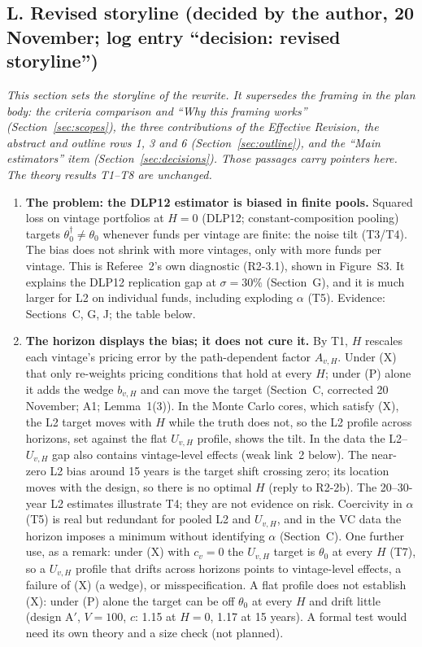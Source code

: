 \documentclass[11pt]{article}
\begin{document}
\subsection*{L. Revised storyline (decided by the author, 20 November; log entry ``decision: revised storyline'')}
\label{sec:storyline}
\emph{This section sets the storyline of the rewrite. It supersedes the framing in the plan body: the criteria comparison and ``Why this framing works'' (Section~\ref{sec:scopes}), the three contributions of the Effective Revision, the abstract and outline rows 1, 3 and 6 (Section~\ref{sec:outline}), and the ``Main estimators'' item (Section~\ref{sec:decisions}). Those passages carry pointers here. The theory results T1--T8 are unchanged.}
\begin{enumerate}
\item \textbf{The problem: the DLP12 estimator is biased in finite pools.} Squared loss on vintage portfolios at $H=0$ (DLP12; constant-composition pooling) targets $\theta_0^\dagger\neq\theta_0$ whenever funds per vintage are finite: the noise tilt (T3/T4). The bias does not shrink with more vintages, only with more funds per vintage. This is Referee~2's own diagnostic (R2-3.1), shown in Figure~S3. It explains the DLP12 replication gap at $\sigma=30\%$ (Section~G), and it is much larger for L2 on individual funds, including exploding $\alpha$ (T5). Evidence: Sections~C, G, J; the table below.
\item \textbf{The horizon displays the bias; it does not cure it.} By T1, $H$ rescales each vintage's pricing error by the path-dependent factor $A_{v,H}$. Under (X) that only re-weights pricing conditions that hold at every $H$; under (P) alone it adds the wedge $b_{v,H}$ and can move the target (Section~C, corrected 20 November; A1; Lemma~1(3)). In the Monte Carlo cores, which satisfy (X), the L2 target moves with $H$ while the truth does not, so the L2 profile across horizons, set against the flat $U_{v,H}$ profile, shows the tilt. In the data the L2--$U_{v,H}$ gap also contains vintage-level effects (weak link~2 below). The near-zero L2 bias around 15 years is the target shift crossing zero; its location moves with the design, so there is no optimal $H$ (reply to R2-2b). The 20--30-year L2 estimates illustrate T4; they are not evidence on risk. Coercivity in $\alpha$ (T5) is real but redundant for pooled L2 and $U_{v,H}$, and in the VC data the horizon imposes a minimum without identifying $\alpha$ (Section~C). One further use, as a remark: under (X) with $c_v=0$ the $U_{v,H}$ target is $\theta_0$ at every $H$ (T7), so a $U_{v,H}$ profile that drifts across horizons points to vintage-level effects, a failure of (X) (a wedge), or misspecification. A flat profile does not establish (X): under (P) alone the target can be off $\theta_0$ at every $H$ and drift little (design A$'$, $V=100$, $c$: 1.15 at $H=0$, 1.17 at 15 years). A formal test would need its own theory and a size check (not planned).

\end{enumerate}
\end{document}
